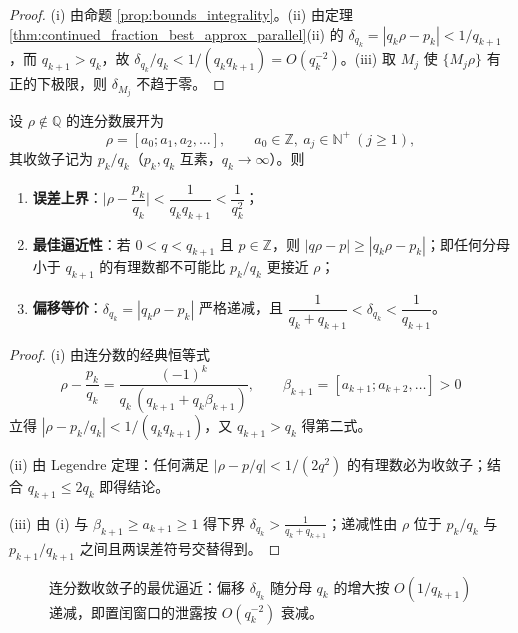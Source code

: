 \begin{proof}
(i) 由命题 \ref{prop:bounds_integrality}。(ii) 由定理 \ref{thm:continued_fraction_best_approx_parallel}(ii) 的 $\delta_{q_k}=|q_k\rho-p_k|<1/q_{k+1}$，而 $q_{k+1}>q_k$，故 $\delta_{q_k}/q_k<1/(q_kq_{k+1})=O(q_k^{-2})$。(iii) 取 $M_j$ 使 $\{M_j\rho\}$ 有正的下极限，则 $\delta_{M_j}$ 不趋于零。
\end{proof}

\begin{theorem}[连分数最佳逼近]\label{thm:continued_fraction_best_approx_parallel}
设 $\rho\notin\mathbb{Q}$ 的连分数展开为
\[
\rho=[a_0;a_1,a_2,\dots],\qquad a_0\in\mathbb{Z},\ a_j\in\mathbb{N}^+\ (j\ge1),
\]
其收敛子记为 $p_k/q_k$（$p_k,q_k$ 互素，$q_k\to\infty$）。则
\begin{enumerate}[label=(\roman*)]
    \item \textbf{误差上界}：$\Big|\rho-\dfrac{p_k}{q_k}\Big|<\dfrac{1}{q_kq_{k+1}}<\dfrac{1}{q_k^2}$；
    \item \textbf{最佳逼近性}：若 $0<q<q_{k+1}$ 且 $p\in\mathbb{Z}$，则 $|q\rho-p|\ge|q_k\rho-p_k|$；即任何分母小于 $q_{k+1}$ 的有理数都不可能比 $p_k/q_k$ 更接近 $\rho$；
    \item \textbf{偏移等价}：$\delta_{q_k}=|q_k\rho-p_k|$ 严格递减，且 $\dfrac{1}{q_k+q_{k+1}}<\delta_{q_k}<\dfrac{1}{q_{k+1}}$。
\end{enumerate}
\end{theorem}

\begin{proof}
(i) 由连分数的经典恒等式
\[
\rho-\frac{p_k}{q_k}=\frac{(-1)^k}{q_k\,(q_{k+1}+q_k\beta_{k+1})},\qquad \beta_{k+1}=[a_{k+1};a_{k+2},\dots]>0
\]
立得 $|\rho-p_k/q_k|<1/(q_kq_{k+1})$，又 $q_{k+1}>q_k$ 得第二式。

(ii) 由 Legendre 定理：任何满足 $|\rho-p/q|<1/(2q^2)$ 的有理数必为收敛子；结合 $q_{k+1}\le2q_k$ 即得结论。

(iii) 由 (i) 与 $\beta_{k+1}\ge a_{k+1}\ge1$ 得下界 $\delta_{q_k}>\frac{1}{q_k+q_{k+1}}$；递减性由 $\rho$ 位于 $p_k/q_k$ 与 $p_{k+1}/q_{k+1}$ 之间且两误差符号交替得到。
\end{proof}

\begin{figure}[htbp]
\centering
{}
\caption{连分数收敛子的最优逼近：偏移 $\delta_{q_k}$ 随分母 $q_k$ 的增大按 $O(1/q_{k+1})$ 递减，即置闰窗口的泄露按 $O(q_k^{-2})$ 衰减。}
\label{fig:continued_fraction_convergence}
\end{figure}


